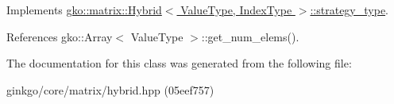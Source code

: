 Implements \hyperlink{classgko_1_1matrix_1_1Hybrid_1_1strategy__type_a0a0cd4024f27c7d0f286f35fc0a6de60}{gko\+::matrix\+::\+Hybrid$<$ Value\+Type, Index\+Type $>$\+::strategy\+\_\+type}.



References gko\+::\+Array$<$ Value\+Type $>$\+::get\+\_\+num\+\_\+elems().



The documentation for this class was generated from the following file\+:\begin{DoxyCompactItemize}
\item 
ginkgo/core/matrix/hybrid.\+hpp (05eef757)\end{DoxyCompactItemize}
